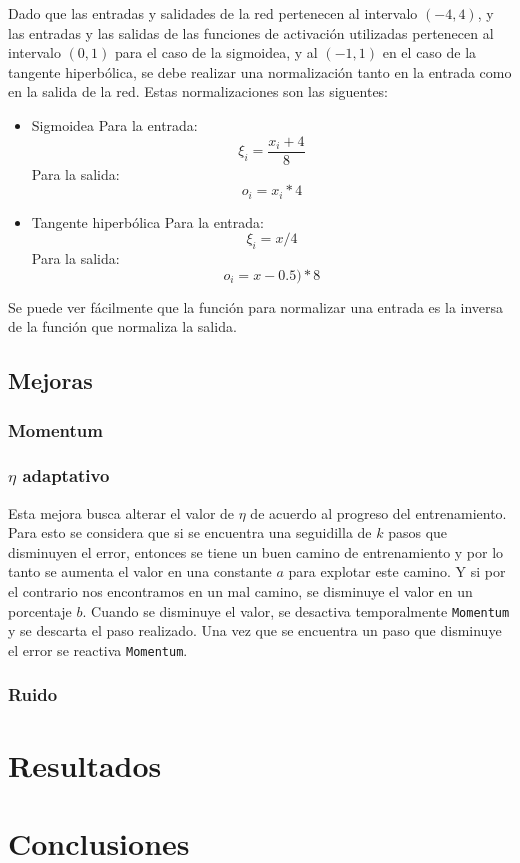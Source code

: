 \documentclass[a4paper,10pt]{article}
\begin{document}
        Dado que las entradas y salidades de la red pertenecen al intervalo $(-4, 4)$, y las entradas y las salidas de las funciones de activación utilizadas 
        pertenecen al intervalo $(0,1)$ para el caso de la sigmoidea, y al $(-1,1)$ en el caso de la tangente hiperbólica, se debe realizar una normalización 
        tanto en la entrada como en la salida de la red. Estas normalizaciones son las siguentes:

        \begin{itemize}
            \item Sigmoidea
                Para la entrada: \[ \xi_{i} = \frac{x_{i} + 4}{8} \]
                Para la salida: \[ o_{i} = x_{i} * 4 \]
            \item Tangente hiperbólica
                Para la entrada: \[ \xi_{i} = x / 4 \]
                Para la salida: \[ o_{i} = x - 0.5) * 8 \]
        \end{itemize}

        Se puede ver fácilmente que la función para normalizar una entrada es la inversa de la función que normaliza la salida.

\subsection{Mejoras}

    \subsubsection{Momentum}

    \subsubsection{$\eta$ adaptativo}

    Esta mejora busca alterar el valor de $\eta$ de acuerdo al progreso del entrenamiento.
    Para esto se considera que si se encuentra una seguidilla de $k$ pasos que disminuyen el error, entonces se tiene un buen camino de entrenamiento y por lo tanto se aumenta 
    el valor en una constante $a$ para explotar este camino. Y si por el contrario nos encontramos en un mal camino, se disminuye el valor en un porcentaje $b$.
    Cuando se disminuye el valor, se desactiva temporalmente \texttt{Momentum} y se descarta el paso realizado.
    Una vez que se encuentra un paso que disminuye el error se reactiva \texttt{Momentum}.

    \subsubsection{Ruido}

\section{Resultados}

\section{Conclusiones}



\end{document}

